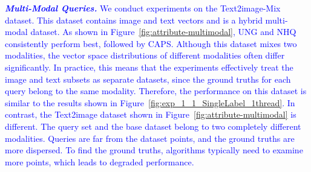 \documentclass[sigconf, nonacm]{acmart}
\begin{document}
{%
	\textit{\textbf{\textcolor{blue}{Multi-Modal Queries.}}} \textcolor{blue}{
		We conduct experiments on the Text2image-Mix dataset. This dataset contains image and text vectors and is a hybrid multi-modal dataset. As shown in Figure~\ref{fig:attribute-multimodal}, UNG and NHQ consistently perform best, followed by CAPS.
		Although this dataset mixes two modalities, the vector space distributions of different modalities often differ significantly. In practice, this means that the experiments effectively treat the image and text subsets as separate datasets, since the ground truths for each query belong to the same modality. Therefore, the performance on this dataset is similar to the results shown in Figure~\ref{fig:exp_1_1_SingleLabel_1thread}.
		In contrast, the Text2image dataset shown in Figure~\ref{fig:attribute-multimodal} is different. The query set and the base dataset belong to two completely different modalities. Queries are far from the dataset points, and the ground truths are more dispersed. To find the ground truths, algorithms typically need to examine more points, which leads to degraded performance.
}}
\end{document}
